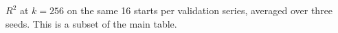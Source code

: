 \begin{center}\small

\end{center}
{\scriptsize $R^2$ at $k=256$ on the same 16 starts per validation series, averaged over three seeds. This is a subset of the main table.}
